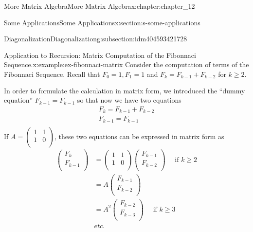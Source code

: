 \documentclass[twoside,10pt,]{book}
\numberwithin{equation}{section}
\begin{document}
\begin{chapterptx}{More Matrix Algebra}{}{More Matrix Algebra}{}{}{x:chapter:chapter_12}
\begin{sectionptx}{Some Applications}{}{Some Applications}{}{}{x:section:s-some-applications}
\begin{subsectionptx}{Diagonalization}{}{Diagonalization}{}{}{g:subsection:idm404593421728}
\begin{example}{Application to Recursion: Matrix Computation of the Fibonnaci Sequence.}{x:example:ex-fibonnaci-matrix}
%
Consider the computation of terms of the Fibonnaci Sequence.  Recall that  \(F_0= 1, F_1= 1\) and \(F_k= F_{k-1}+F_{k-2}\)  for \(k\geq 2\).%
\par
In order to formulate the calculation in matrix form, we introduced the ``dummy equation'' \(F_{k-1}= F_{k-1}\) so that now we have two equations%
\begin{equation*}
\begin{array}{c}
F_k= F_{k-1}+F_{k-2}\\
F_{k-1}= F_{k-1}\\
\end{array}
\end{equation*}
If \(A = \left(
\begin{array}{cc}
1 & 1 \\
1 & 0 \\
\end{array}
\right)\), these two equations can be expressed in matrix form as%
\begin{equation*}
\begin{split}
\left(
\begin{array}{c}
F_k \\
F_{k-1} \\
\end{array}
\right) &=\left(
\begin{array}{cc}
1 & 1 \\
1 & 0 \\
\end{array}
\right)\left(
\begin{array}{c}
F_{k-1} \\
F_{k-2} \\
\end{array}
\right) \quad\textrm{ if } k\geq 2\\
&= A \left(
\begin{array}{c}
F_{k-1} \\
F_{k-2} \\
\end{array}
\right)\\
&= A^2\left(
\begin{array}{c}
F_{k-2} \\
F_{k-3} \\
\end{array}
\right) \quad\textrm{ if } k\geq 3\\
& etc.\\
\end{split}
\end{equation*}

\end{example}
\end{subsectionptx}
\end{sectionptx}
\end{chapterptx}
\end{document}
